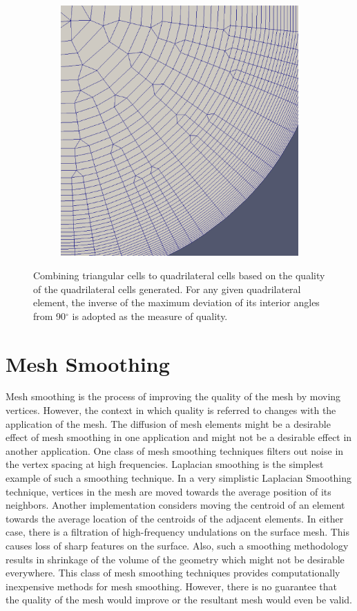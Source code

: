 \begin{figure}
\begin{subfigure}{0.5\textwidth}
		\includegraphics[width =0.9\linewidth]{img/m2/combine-tris-to-quads/combineTrisToQuads2.eps}
		\caption{}
		\label{fig-triQuad2}
	\end{subfigure}
	\caption[Combining triangular cells to quadrilateral cells in EDAMSurf.]{Combining triangular cells to quadrilateral cells based on the quality of the quadrilateral cells generated. For any given quadrilateral element, the inverse of the maximum deviation of its interior angles from 90$^\circ$ is adopted as the measure of quality.}
	\label{fig-triQuad}
\end{figure}

\section{Mesh Smoothing}

Mesh smoothing is the process of improving the quality of the mesh by moving vertices. However, the context in which quality is referred to changes with the application of the mesh. The diffusion of mesh elements might be a desirable effect of mesh smoothing in one application and might not be a desirable effect in another application. One class of mesh smoothing techniques filters out noise in the vertex spacing at high frequencies. Laplacian smoothing is the simplest example of such a smoothing technique. In a very simplistic Laplacian Smoothing technique, vertices in the mesh are moved towards the average position of its neighbors. Another implementation considers moving the centroid of an element towards the average location of the centroids of the adjacent elements. In either case, there is a filtration of high-frequency undulations on the surface mesh. This causes loss of sharp features on the surface. Also, such a smoothing methodology results in shrinkage of the volume of the geometry which might not be desirable everywhere. This class of mesh smoothing techniques provides computationally inexpensive methods for mesh smoothing. However, there is no guarantee that the quality of the mesh would improve or the resultant mesh would even be valid.

